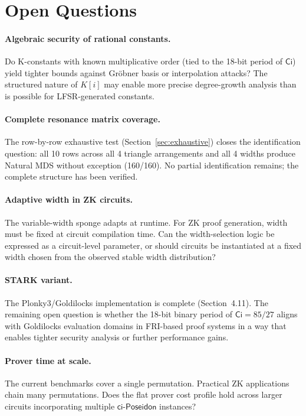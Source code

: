 \documentclass[preprint]{iacrtrans}
\newcommand{\Ci}{\ensuremath{\mathsf{Ci}}}
\newcommand{\ciposeidon}{\ensuremath{\mathsf{ci\text{-}Poseidon}}}
\begin{document}
\section{Open Questions}

\paragraph{Algebraic security of rational constants.}
Do K-constants with known multiplicative order (tied to the 18-bit period of
$\Ci$) yield tighter bounds against Gröbner basis or interpolation attacks?
The structured nature of $K[i]$ may enable more precise degree-growth analysis
than is possible for LFSR-generated constants.

\paragraph{Complete resonance matrix coverage.}
The row-by-row exhaustive test (Section~\ref{sec:exhaustive}) closes the
identification question: all 10 rows across all 4 triangle arrangements
and all 4 widths produce Natural MDS without exception (160/160). No
partial identification remains; the complete structure has been verified.

\paragraph{Adaptive width in ZK circuits.}
The variable-width sponge adapts at runtime. For ZK proof generation, width
must be fixed at circuit compilation time. Can the width-selection logic be
expressed as a circuit-level parameter, or should circuits be instantiated
at a fixed width chosen from the observed stable width distribution?

\paragraph{STARK variant.}
The Plonky3/Goldilocks implementation is complete (Section~4.11). The
remaining open question is whether the 18-bit binary period of $\Ci = 85/27$
aligns with Goldilocks evaluation domains in FRI-based proof systems in a
way that enables tighter security analysis or further performance gains.

\paragraph{Prover time at scale.}
The current benchmarks cover a single permutation. Practical ZK applications
chain many permutations. Does the flat prover cost profile hold across larger
circuits incorporating multiple \ciposeidon{} instances?
\end{document}
